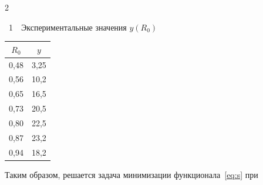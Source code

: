 \begin{multicols}{2}
\vspace*{6pt}



 {\small \begin{center}  %

 \noindent

\parbox{32mm}{{{\tablename~1}\ \ \small{Экспериментальные значения $y(R_0)$}}

}



\vspace*{2ex}





    \tabcolsep=12pt

    \begin{tabular}{|c|c|}

    \hline

    $R_0$   &   $y$\\

    \hline

    0,48 & \hphantom{9,}3,25\\

    0,56  &10,2\\

    0,65  &16,5\\

    0,73  &20,5\\

    0,80  &22,5\\

    0,87 &23,2\\

    0,94 &18,2 \\ 

    \hline

  \end{tabular}

  \end{center}

  }







\vspace*{6pt}



\addtocounter{table}{1}



Таким образом, решается задача минимизации функционала~\eqref{eq:s} при


\end{multicols}

